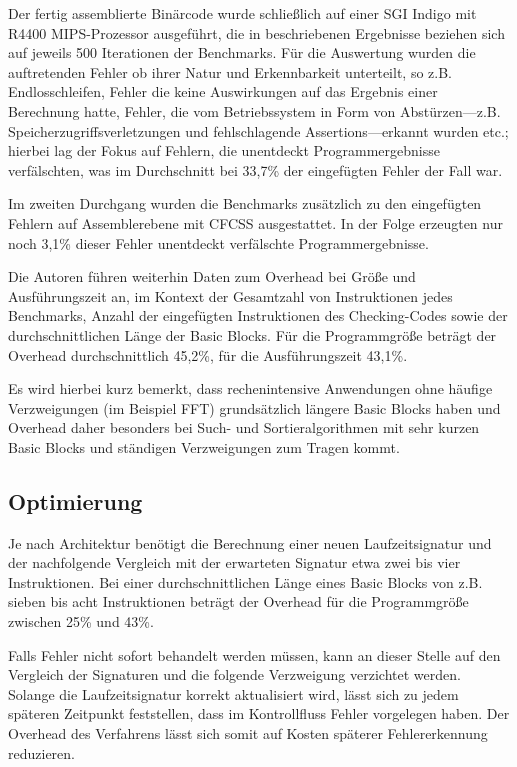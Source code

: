 \documentclass[11pt]{article}
\begin{document}
Der fertig assemblierte Binärcode wurde schließlich auf einer SGI Indigo mit
R4400 MIPS-Prozessor ausgeführt, die in \cite{oh-2002-control} beschriebenen
Ergebnisse beziehen sich auf jeweils 500 Iterationen der Benchmarks. Für die
Auswertung wurden die auftretenden Fehler ob ihrer Natur und Erkennbarkeit
unterteilt, so z.B. Endlosschleifen, Fehler die keine Auswirkungen auf das
Ergebnis einer Berechnung hatte, Fehler, die vom Betriebssystem in Form von
Abstürzen—z.B. Speicherzugriffsverletzungen und fehlschlagende
Assertions—erkannt wurden etc.; hierbei lag der Fokus auf Fehlern, die
unentdeckt Programmergebnisse verfälschten, was im Durchschnitt bei 33,7\% der
eingefügten Fehler der Fall war.

Im zweiten Durchgang wurden die Benchmarks zusätzlich zu den eingefügten
Fehlern auf Assemblerebene mit CFCSS ausgestattet. In der Folge erzeugten nur
noch 3,1\% dieser Fehler unentdeckt verfälschte Programmergebnisse.

Die Autoren führen weiterhin Daten zum Overhead bei Größe und Ausführungszeit
an, im Kontext der Gesamtzahl von Instruktionen jedes Benchmarks, Anzahl der
eingefügten Instruktionen des Checking-Codes sowie der durchschnittlichen Länge
der Basic Blocks. Für die Programmgröße beträgt der Overhead durchschnittlich
45,2\%, für die Ausführungszeit 43,1\%.

Es wird hierbei kurz bemerkt, dass rechenintensive Anwendungen ohne häufige
Verzweigungen (im Beispiel FFT) grundsätzlich längere Basic Blocks haben und
Overhead daher besonders bei Such- und Sortieralgorithmen mit sehr kurzen Basic
Blocks und ständigen Verzweigungen zum Tragen kommt.

\subsection{Optimierung}

Je nach Architektur benötigt die Berechnung einer neuen Laufzeitsignatur und
der nachfolgende Vergleich mit der erwarteten Signatur etwa zwei bis vier
Instruktionen. Bei einer durchschnittlichen Länge eines Basic Blocks von z.B.
sieben bis acht Instruktionen beträgt der Overhead für die Programmgröße
zwischen 25\% und 43\%. %

Falls Fehler nicht sofort behandelt werden müssen, kann an dieser Stelle auf
den Vergleich der Signaturen und die folgende Verzweigung verzichtet werden.
Solange die Laufzeitsignatur korrekt aktualisiert wird, lässt sich zu jedem
späteren Zeitpunkt feststellen, dass im Kontrollfluss Fehler vorgelegen haben.
Der Overhead des Verfahrens lässt sich somit auf Kosten späterer
Fehlererkennung reduzieren.
\end{document}
